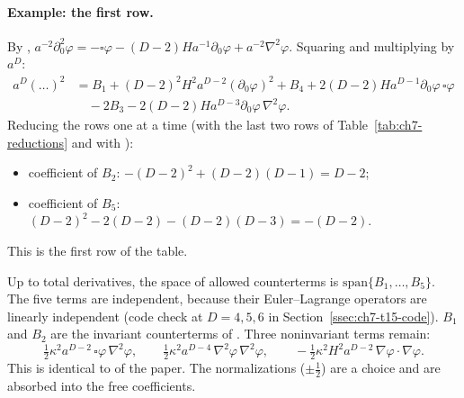 \paragraph{Example: the first row.}
By , $a^{-2}\partial_0^2\varphi=-\square\varphi-(D-2)Ha^{-1}\partial_0\varphi+a^{-2}\nabla^2\varphi$. Squaring and multiplying by $a^D$:
\begin{equation*}
\begin{aligned}
a^D(\ldots)^2&=B_1+(D-2)^2H^2a^{D-2}(\partial_0\varphi)^2+B_4+2(D-2)Ha^{D-1}\partial_0\varphi\,\square\varphi\\
&\quad-2B_3-2(D-2)Ha^{D-3}\partial_0\varphi\,\nabla^2\varphi .
\end{aligned}
\end{equation*}
Reducing the rows one at a time (with the last two rows of Table~\ref{tab:ch7-reductions} and with ):
\begin{itemize}[leftmargin=14pt]
\item coefficient of $B_2$: $-(D-2)^2+(D-2)(D-1)=D-2$;
\item coefficient of $B_5$: $(D-2)^2-2(D-2)-(D-2)(D-3)=-(D-2)$.
\end{itemize}
This is the first row of the table.

\begin{resultbox}
Up to total derivatives, the space of allowed counterterms is $\mathrm{span}\{B_1,\ldots,B_5\}$.
The five terms are independent, because their Euler--Lagrange operators are linearly independent (code check at $D=4,5,6$ in Section~\ref{ssec:ch7-t15-code}).
$B_1$ and $B_2$ are the invariant counterterms of . Three noninvariant terms remain:
\begin{equation*}
\tfrac12\kappa^2a^{D-2}\,\square\varphi\,\nabla^2\varphi,\qquad \tfrac12\kappa^2a^{D-4}\,\nabla^2\varphi\,\nabla^2\varphi,\qquad -\tfrac12\kappa^2H^2a^{D-2}\,\nabla\varphi\cdot\nabla\varphi .
\tag{I.144}
\end{equation*}
This is identical to  of the paper. \checkmark{}
The normalizations ($\pm\tfrac12$) are a choice and are absorbed into the free coefficients.
\end{resultbox}

